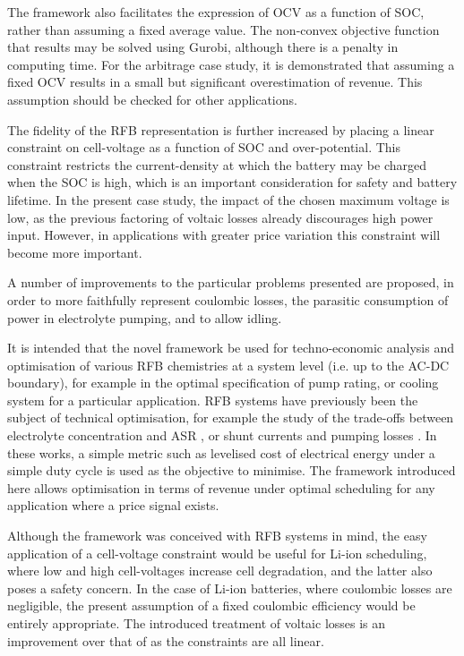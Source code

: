 \documentclass[preprint,3p,review,authoryear,10pt]{elsarticle}
\begin{document}
The framework also facilitates the expression of OCV as a function of SOC, rather than assuming a fixed average value. The non-convex objective function that results may be solved using Gurobi, although there is a penalty in computing time. For the arbitrage case study, it is demonstrated that assuming a fixed OCV results in a small but significant overestimation of revenue. This assumption should be checked for other applications.

The fidelity of the RFB representation is further increased by placing a linear constraint on cell-voltage as a function of SOC and over-potential. This constraint restricts the current-density at which the battery may be charged when the SOC is high, which is an important consideration for safety and battery lifetime. In the present case study, the impact of the chosen maximum voltage is low, as the previous factoring of voltaic losses already discourages high power input. However, in applications with greater price variation this constraint will become more important. 

A number of improvements to the particular problems presented are proposed, in order to more faithfully represent coulombic losses, the parasitic consumption of power in electrolyte pumping, and to allow idling.

It is intended that the novel framework be used for techno-economic analysis and optimisation of various RFB chemistries at a system level (i.e. up to the AC-DC boundary), for example in the optimal specification of pump rating, or cooling system for a particular application. RFB systems have previously been the subject of technical optimisation, for example the study of the trade-offs between electrolyte concentration and ASR \citep{Weber2013}, or shunt currents and pumping losses \citep{Viswanathan2014}. In these works, a simple metric such as levelised cost of electrical energy under a simple duty cycle is used as the objective to minimise. The framework introduced here allows optimisation in terms of revenue under optimal scheduling for any application where a price signal exists.

Although the framework was conceived with RFB systems in mind, the easy application of a cell-voltage constraint would be useful for Li-ion scheduling, where low and high cell-voltages increase cell degradation, and the latter also poses a safety concern. In the case of Li-ion batteries, where coulombic losses are negligible, the present assumption of a fixed coulombic efficiency would be entirely appropriate. The introduced treatment of voltaic losses is an improvement over that of \cite{Sarker2017} as the constraints are all linear.
\end{document}
